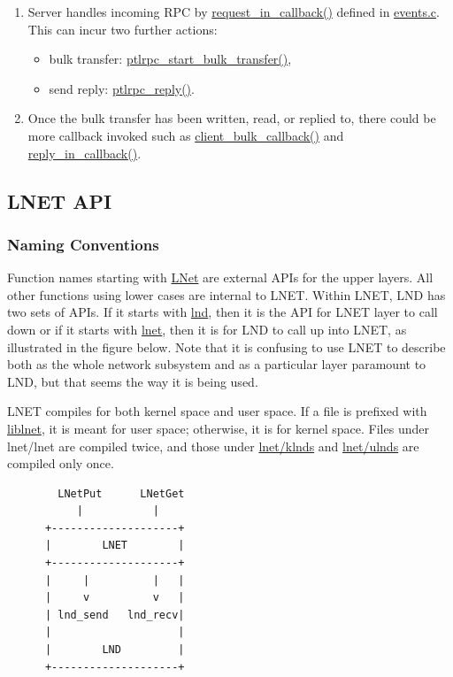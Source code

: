 \begin{enumerate}
\begin{itemize}
  \end{itemize}

\item Server handles incoming RPC by \url{request_in_callback()} defined in
\url{events.c}. This can incur two further actions:

  \begin{itemize}

  \item bulk transfer: \url{ptlrpc_start_bulk_transfer()},

  \item send reply: \url{ptlrpc_reply()}.

  \end{itemize}

\item Once the bulk transfer has been written, read, or replied to, there could be
more callback invoked such as \url{client_bulk_callback()} and
\url{reply_in_callback()}.

\end{enumerate}

\subsection{LNET API}

\subsubsection*{Naming Conventions}

Function names starting with \url{LNet} are external APIs for the upper
layers. All other functions using lower cases are internal to LNET.  Within
LNET, LND has two sets of APIs. If it starts with \url{lnd}, then it is the
API for LNET layer to call down or if it starts with \url{lnet}, then it is
for LND to call up into LNET, as illustrated in the figure below. Note that it
is confusing to use LNET to describe both as the whole network subsystem and
as a particular layer paramount to LND, but that seems the way it is being
used.

LNET compiles for both kernel space and user space. If a file is prefixed with
\url{liblnet}, it is meant for user space; otherwise, it is for kernel
space. Files under lnet/lnet are compiled twice, and those under
\url{lnet/klnds} and \url{lnet/ulnds} are compiled only once.


\begin{Verbatim}
        LNetPut      LNetGet
           |           |
      +--------------------+
      |        LNET        |
      +--------------------+               
      |     |          |   |
      |     v          v   |
      | lnd_send   lnd_recv|
      |                    |
      |        LND         |
      +--------------------+
\end{Verbatim}

